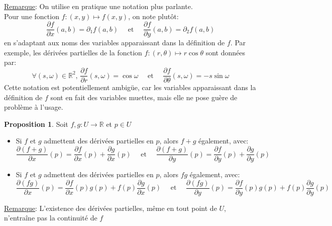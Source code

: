 \documentclass[10pt,a4paper]{article}
\theoremstyle{definition}
\newtheorem{proposition}{Proposition}[section]
\begin{document}
\noindent \uline{Remarque}: On utilise en pratique une notation plus parlante. \\
Pour une fonction $f: (x, y) \mapsto f(x, y)$, on note plutôt:
\[ \frac{\partial f}{\partial x} (a, b) = \partial_1 f(a, b) \quad \text{ et } \quad \frac{\partial f}{\partial y} (a, b) = \partial_2 f(a, b) \]
en s'adaptant aux noms des variables apparaissant dans la définition de $f$. Par exemple, les dérivées partielles de la fonction $f: (r, \theta) \mapsto r \cos \theta$ sont données par:
\[ \forall (s, \omega) \in \mathbb{R}^2,\, \frac{\partial f}{\partial r} (s, \omega) = \cos \omega \quad \text{ et } \quad \frac{\partial f}{\partial \theta} (s, \omega) = -s \sin \omega \]
Cette notation est potentiellement ambigüe, car les variables apparaissant dans la définition de $f$ sont en fait des variables muettes, mais elle ne pose guère de problème à l'usage.
\begin{proposition}
Soit $f, g: U \to \mathbb{R}$ et $p \in U$
\begin{itemize}
\item Si $f$ et $g$ admettent des dérivées partielles en $p$, alors $f + g$ également, avec:
\[ \frac{\partial (f + g)}{\partial x} (p) = \frac{\partial f}{\partial x} (p) + \frac{\partial g}{\partial x} (p) \quad \text{ et } \quad \frac{\partial (f + g)}{\partial y} (p) = \frac{\partial f}{\partial y} (p) + \frac{\partial g}{\partial y} (p) \]
\item Si $f$ et $g$ admettent des dérivées partielles en $p$, alors $fg$ également, avec:
\[ \frac{\partial (f g)}{\partial x} (p) = \frac{\partial f}{\partial x} (p) g(p) + f(p) \frac{\partial g}{\partial x} (p) \quad \text{ et } \quad \frac{\partial (f g)}{\partial y} (p) = \frac{\partial f}{\partial y} (p) g(p) + f(p) \frac{\partial g}{\partial y} (p) \]
\end{itemize}
\end{proposition}

\noindent \uline{Remarque}: L'existence des dérivées partielles, même en tout point de $U$, n'entraîne pas la continuité de $f$
\end{document}
